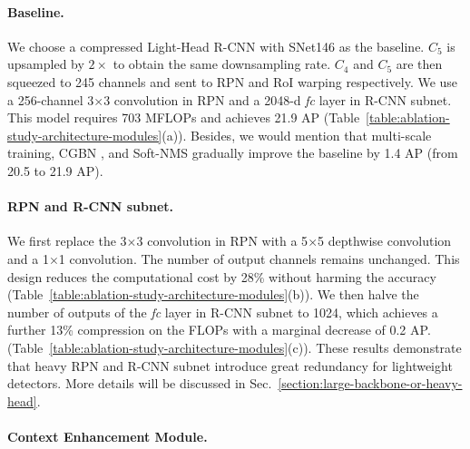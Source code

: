 \paragraph{Baseline.}

We choose a compressed Light-Head R-CNN \cite{li2017light} with SNet146 as the baseline.
$C_5$ is upsampled by $2\times$ to obtain the same downsampling rate.
$C_4$ and $C_5$ are then squeezed to 245 channels and sent to RPN and RoI warping respectively.
We use a 256-channel 3$\times$3 convolution in RPN and a 2048-d \emph{fc} layer in R-CNN subnet.
This model requires 703 MFLOPs and achieves 21.9 AP (Table~\ref{table:ablation-study-architecture-modules}(a)).
Besides, we would mention that multi-scale training, CGBN \cite{peng2018megdet}, and Soft-NMS \cite{bodla2017soft} gradually improve the baseline by 1.4 AP (from 20.5 to 21.9 AP).

\vspace{-12pt}
\paragraph{RPN and R-CNN subnet.}

We first replace the 3$\times$3 convolution in RPN with a 5$\times$5 depthwise convolution and a 1$\times$1 convolution.
The number of output channels remains unchanged.
This design reduces the computational cost by 28\% without harming the accuracy (Table~\ref{table:ablation-study-architecture-modules}(b)).
We then halve the number of outputs of the \emph{fc} layer in R-CNN subnet to 1024, which achieves a further 13\% compression on the FLOPs with a marginal decrease of 0.2 AP. (Table~\ref{table:ablation-study-architecture-modules}(c)).
These results demonstrate that heavy RPN and R-CNN subnet introduce great redundancy for lightweight detectors.
More details will be discussed in Sec.~\ref{section:large-backbone-or-heavy-head}.

\vspace{-12pt}
\paragraph{Context Enhancement Module.}

